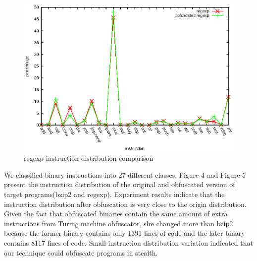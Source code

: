\documentclass[lnicst]{svmultln}
\begin{document}
\begin{figure}
  \includegraphics[width=0.9\linewidth]{st_regexp.eps}
  \caption{regexp instruction distribution comparison}
  \label{Figure 5}
\end{figure}
 We classified binary instructions into 27 different classes. Figure 4 and Figure 5 present the instruction distribution of the original and obfuscated version of target programs(bzip2 and regexp). Experiment results indicate that the instruction distribution after obfuscation is very close to the origin distribution. Given the fact that obfuscated binaries contain the same amount of extra instructions from Turing machine obfuscator, slre changed more than bzip2 because the former binary contains only 1391 lines of code and the later binary contains 8117 lines of code. Small instruction distribution variation indicated that our technique could obfuscate programs in stealth.
\end{document}
